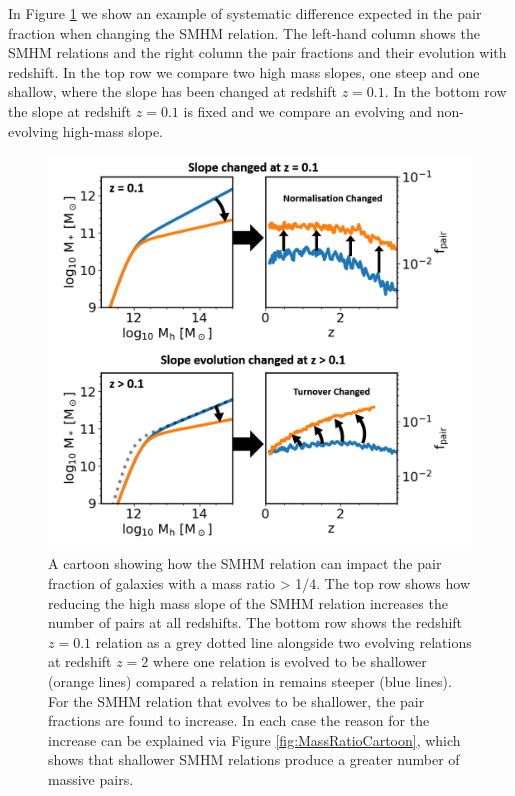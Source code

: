 In Figure \ref{fig:SMHM_PF_Cartoon} we show an example of systematic difference expected in the pair fraction when changing the SMHM relation.
The left-hand column shows the SMHM relations and the right column the pair fractions and their evolution with redshift. 
In the top row we compare two high mass slopes, one steep and one shallow, where the slope has been changed at redshift $z = 0.1$.
In the bottom row the slope at redshift $z = 0.1$ is fixed and we compare an evolving and non-evolving high-mass slope.

\begin{figure}[h]
	\centering
	\includegraphics[width = \linewidth]{Figures/Chapter5/SMHM_PF_Cartoon.png}
	\caption{A cartoon showing how the SMHM relation can impact the pair fraction of galaxies with a mass ratio > 1/4. The top row shows how reducing the high mass slope of the SMHM relation increases the number of pairs at all redshifts. The bottom row shows the redshift $z=0.1$ relation as a grey dotted line alongside two evolving relations at redshift $z=2$ where one relation is evolved to be shallower (orange lines) compared a relation in remains steeper (blue lines). For the SMHM relation that evolves to be shallower, the pair fractions are found to increase. In each case the reason for the increase can be explained via Figure \ref{fig:MassRatioCartoon}, which shows that shallower SMHM relations produce a greater number of massive pairs. }
	\label{fig:SMHM_PF_Cartoon}
\end{figure}

